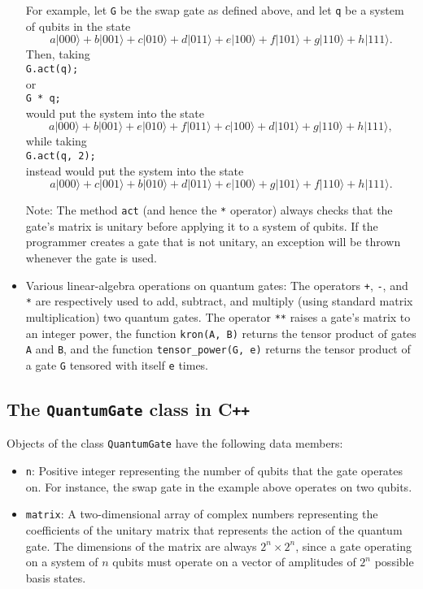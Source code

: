 \documentclass{article}
\newcommand{\cpp}{C{}\texttt{++}}
\begin{document}
\begin{itemize}
For example, let \verb~G~ be the swap gate as defined above, and let \verb~q~ be a system of qubits in the state 
\[ a|000\rangle + b|001\rangle + c|010\rangle + d|011\rangle + e|100\rangle + f|101\rangle + g|110\rangle + h|111\rangle .\] 
Then, taking \\
\hspace*{1em} \verb~G.act(q);~\\
or\\
\hspace*{1em} \verb~G * q;~\\
would put the system into the state
\[ a|000\rangle + b|001\rangle + e|010\rangle + f|011\rangle + c|100\rangle + d|101\rangle + g|110\rangle + h|111\rangle, \] 
while taking \\
\hspace*{1em} \verb~G.act(q, 2);~\\
instead would put the system into the state
\[ a|000\rangle + c|001\rangle + b|010\rangle + d|011\rangle + e|100\rangle + g|101\rangle + f|110\rangle + h|111\rangle .\] 

Note: The method \verb~act~ (and hence the \verb~*~ operator) always checks that the gate's matrix is unitary before applying it to a system of qubits. If the programmer creates a gate that is not unitary, an exception will be thrown whenever the gate is used. 

\item Various linear-algebra operations on quantum gates: The operators \verb~+~, \verb~-~, and \verb~*~ are respectively used to add, subtract, and multiply (using standard matrix multiplication) two quantum gates. The operator \verb~**~ raises a gate's matrix to an integer power, the function \verb~kron(A, B)~ returns the tensor product of gates \verb~A~ and \verb~B~, and the function \verb~tensor_power(G, e)~ returns the tensor product of a gate \verb~G~ tensored with itself \verb~e~ times. 

\end{itemize} 


\subsection{The \texttt{QuantumGate} class in \cpp}

Objects of the class \verb~QuantumGate~ have the following data members: 
\begin{itemize} 
\item \verb~n~: Positive integer representing the number of qubits that the gate operates on. For instance, the swap gate in the example above operates on two qubits. 

\item \verb~matrix~: A two-dimensional array of complex numbers representing the coefficients of the unitary matrix that represents the action of the quantum gate. The dimensions of the matrix are always $2^n \times 2^n$, since a gate operating on a system of $n$ qubits must operate on a vector of amplitudes of $2^n$ possible basis states. 

\end{itemize} 
\end{document}
